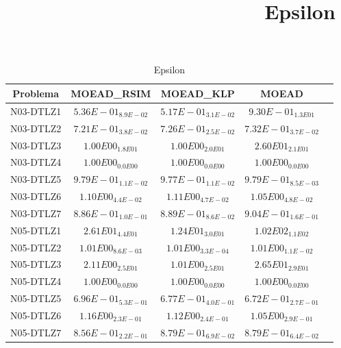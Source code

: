 \documentclass{article}
\title{Epsilon}
\author{}
\begin{document}
\maketitle
\begin{table*}[ht!]
\scriptsize
\caption{Epsilon}
\centering\begin{tabular}{|c||c||c||c||c|} \hline
Problema &MOEAD_RSIM &MOEAD_KLP &MOEAD\\\hline
N03-DTLZ1 &\cellcolor{gray25}$5.36E-01_{8.9E-02}$ &\cellcolor{gray95}$5.17E-01_{3.1E-02}$ &$9.30E-01_{1.3E01}$\\ 
\hline
N03-DTLZ2 &\cellcolor{gray95}$7.21E-01_{3.8E-02}$ &\cellcolor{gray25}$7.26E-01_{2.5E-02}$ &$7.32E-01_{3.7E-02}$\\ 
\hline
N03-DTLZ3 &\cellcolor{gray95}$1.00E00_{1.8E01}$ &\cellcolor{gray25}$1.00E00_{2.0E01}$ &$2.60E01_{2.1E01}$\\ 
\hline
N03-DTLZ4 &\cellcolor{gray95}$1.00E00_{0.0E00}$ &\cellcolor{gray25}$1.00E00_{0.0E00}$ &$1.00E00_{0.0E00}$\\ 
\hline
N03-DTLZ5 &$9.79E-01_{1.1E-02}$ &\cellcolor{gray95}$9.77E-01_{1.1E-02}$ &\cellcolor{gray25}$9.79E-01_{8.5E-03}$\\ 
\hline
N03-DTLZ6 &\cellcolor{gray25}$1.10E00_{4.4E-02}$ &$1.11E00_{4.7E-02}$ &\cellcolor{gray95}$1.05E00_{4.8E-02}$\\ 
\hline
N03-DTLZ7 &\cellcolor{gray95}$8.86E-01_{1.0E-01}$ &\cellcolor{gray25}$8.89E-01_{8.6E-02}$ &$9.04E-01_{1.6E-01}$\\ 
\hline
N05-DTLZ1 &\cellcolor{gray25}$2.61E01_{4.4E01}$ &\cellcolor{gray95}$1.24E01_{3.0E01}$ &$1.02E02_{1.1E02}$\\ 
\hline
N05-DTLZ2 &\cellcolor{gray95}$1.01E00_{8.6E-03}$ &\cellcolor{gray25}$1.01E00_{3.3E-04}$ &$1.01E00_{1.1E-02}$\\ 
\hline
N05-DTLZ3 &\cellcolor{gray25}$2.11E00_{2.5E01}$ &\cellcolor{gray95}$1.01E00_{2.5E01}$ &$2.65E01_{2.9E01}$\\ 
\hline
N05-DTLZ4 &\cellcolor{gray95}$1.00E00_{0.0E00}$ &\cellcolor{gray25}$1.00E00_{0.0E00}$ &$1.00E00_{0.0E00}$\\ 
\hline
N05-DTLZ5 &$6.96E-01_{5.3E-01}$ &\cellcolor{gray25}$6.77E-01_{4.0E-01}$ &\cellcolor{gray95}$6.72E-01_{2.7E-01}$\\ 
\hline
N05-DTLZ6 &$1.16E00_{2.3E-01}$ &\cellcolor{gray25}$1.12E00_{2.4E-01}$ &\cellcolor{gray95}$1.05E00_{2.9E-01}$\\ 
\hline
N05-DTLZ7 &\cellcolor{gray95}$8.56E-01_{2.2E-01}$ &$8.79E-01_{6.9E-02}$ &\cellcolor{gray25}$8.79E-01_{6.4E-02}$\\ 

\end{tabular}
\end{table*}
\end{document}
